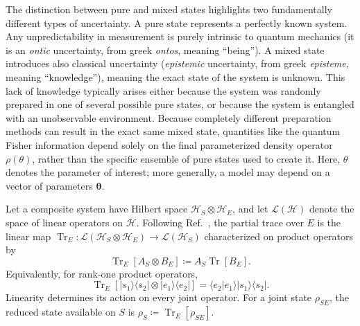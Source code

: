 \begin{remark}
    The distinction between pure and mixed states highlights two fundamentally different types of uncertainty. A pure state represents a perfectly known system. Any unpredictability in measurement is purely intrinsic to quantum mechanics (it is an \emph{ontic} uncertainty, from greek \emph{ontos}, meaning \enquote{being}). A mixed state introduces also classical uncertainty (\emph{epistemic} uncertainty, from greek \emph{episteme}, meaning \enquote{knowledge}), meaning the exact state of the system is unknown. This lack of knowledge typically arises either because the system was randomly prepared in one of several possible pure states, or because the system is entangled with an unobservable environment. Because completely different preparation methods can result in the exact same mixed state, quantities like the quantum Fisher information depend solely on the final parameterized density operator $\rho(\theta)$, rather than the specific ensemble of pure states used to create it. Here, $\theta$ denotes the parameter of interest; more generally, a model may depend on a vector of parameters $\boldsymbol{\theta}$.
\end{remark}

\begin{definition}
    \label{def:partial_trace}
    Let a composite system have Hilbert space $\mathcal{H}_S\otimes\mathcal{H}_E$, and let $\mathcal{L}(\mathcal{H})$ denote the space of linear operators on $\mathcal{H}$. Following Ref.~\cite{nielsen_chuang_2010_quantum_computation_and_quantum_information}, the partial trace over $E$ is the linear map $\operatorname{Tr}_E:\mathcal{L}(\mathcal{H}_S\otimes\mathcal{H}_E)\to\mathcal{L}(\mathcal{H}_S)$ characterized on product operators by
    \begin{equation}
        \operatorname{Tr}_E[A_S\otimes B_E]
        \coloneqq
        A_S\operatorname{Tr}[B_E].
        \label{eq:partial_trace_definition}
    \end{equation}
    Equivalently, for rank-one product operators,
    \begin{equation}
        \operatorname{Tr}_E
        \left[
            |s_1\rangle\langle s_2|\otimes|e_1\rangle\langle e_2|
            \right]
        =
        \langle e_2|e_1\rangle
        |s_1\rangle\langle s_2|.
    \end{equation}
    Linearity determines its action on every joint operator. For a joint state $\rho_{SE}$, the reduced state available on $S$ is $\rho_S\coloneqq\operatorname{Tr}_E[\rho_{SE}]$.
\end{definition}

